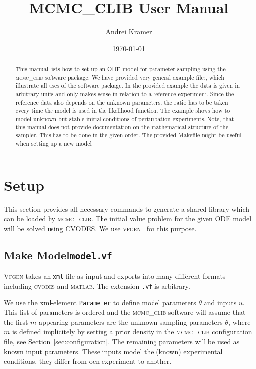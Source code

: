 \documentclass[english,12pt]{scrartcl}
\title{MCMC\_CLIB User Manual}
\author{Andrei Kramer}
\date{\today}
\newcommand{\CLIB}{\textsc{mcmc\_clib}}
\begin{document}
\maketitle
\begin{abstract}
  This manual lists how to set up an ODE model for parameter sampling
  using the \CLIB{} software package. We have provided very general
  example files, which illustrate all uses of the software package. In
  the provided example the data is given in arbitrary units and only
  makes sense in relation to a reference experiment. Since the
  reference data also depends on the unknown parameters, the ratio has
  to be taken every time the model is used in the likelihood
  function. The example shows how to model unknown but stable initial
  conditions of perturbation experiments. Note, that this manual does
  not provide documentation on the mathematical structure of the
  sampler. This has to be done in the given order. The provided
  Makefile might be useful when setting up a new model
\end{abstract}
\tableofcontents
\section{Setup}
\label{sec:setup}

This section provides all necessary commands to generate a shared
library which can be loaded by \CLIB{}. The initial value problem for
the given ODE model will be solved using CVODES. We use
\textsc{vfgen}~\cite{vfgen} for this purpose.

\subsection[make model]{Make Model\hfill\texttt{model.vf}}
\label{sec:model}

\textsc{Vfgen} takes an \texttt{xml} file as input and exports into
many different formats including \textsc{cvodes} and
\textsc{matlab}. The extension \texttt{.vf} is arbitrary.

We use the xml-element \texttt{Parameter} to define model parameters
$\theta$ and inputs $u$. This list of parameters is ordered and the
\CLIB{} software will assume that the first $m$ appearing parameters
are the unknown sampling parameters $\theta$, where $m$ is defined
implicitely by setting a prior density in the \CLIB{} configuration
file, see Section~\vref{sec:configuration}. The remaining parameters
will be used as known input parameters. These inputs model the (known)
experimental conditions, they differ from oen experiment to another.
\end{document}
